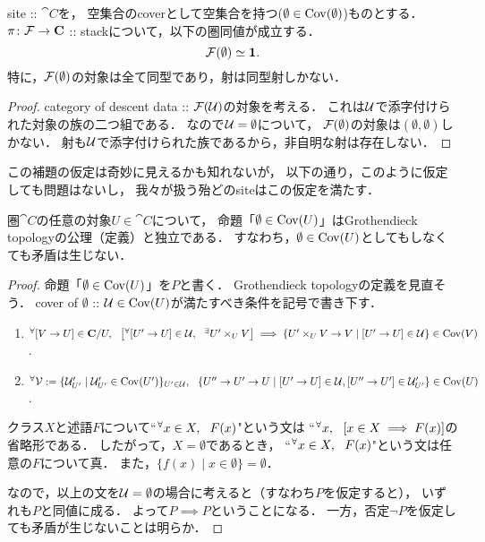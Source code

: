 \documentclass[a4paper]{jsarticle}
\begin{document}
\begin{Lemma}
    site :: $\cat{C}$を，
    空集合のcoverとして空集合を持つ($\emptyset \in \operatorname{Cov}(\emptyset)$)ものとする．
    $\pi \colon \mathcal{F} \to \mathbf{C}$ :: stackについて，以下の圏同値が成立する．
    \[ \mathcal{F}( \emptyset ) \simeq \mathbf{1}. \]
    特に，$\mathcal{F}(\emptyset)$の対象は全て同型であり，射は同型射しかない．
\end{Lemma}
\begin{proof}
    category of descent data :: $\mathcal{F}(\mathcal{U})$の対象を考える．
    これは$\mathcal{U}$で添字付けられた対象の族の二つ組である．
    なので$\mathcal{U}=\emptyset$について，
    $\mathcal{F}(\emptyset)$の対象は$(\emptyset, \emptyset)$しかない．
    射も$\mathcal{U}$で添字付けられた族であるから，非自明な射は存在しない．
\end{proof}

この補題の仮定は奇妙に見えるかも知れないが，
以下の通り，このように仮定しても問題はないし，
我々が扱う殆どのsiteはこの仮定を満たす．

\begin{Claim}
    圏$\cat{C}$の任意の対象$U \in \cat{C}$について，
    命題「$\emptyset \in \operatorname{Cov}(U)$」はGrothendieck topologyの公理（定義）と独立である．
    すなわち，$\emptyset \in \operatorname{Cov}(U)$としてもしなくても矛盾は生じない．
\end{Claim}
\begin{proof}
    命題「$\emptyset \in \operatorname{Cov}(U)$」を$P$と書く．
    Grothendieck topologyの定義を見直そう．
    cover of $\emptyset$ :: $\mathcal{U} \in \operatorname{Cov}(U)$が満たすべき条件を記号で書き下す．
    \begin{enumerate}[label=(\alph*)]
        \item
            ${}^{\forall} [V \to U] \in \mathbf{C}/U,~~
            \left[ {}^{\forall} [U' \to U] \in \mathcal{U},~~ {}^{\exists} U' \times_{U} V \right]
            \implies \{ U' \times_{U} V \to V \mid [U' \to U] \in \mathcal{U} \} \in \operatorname{Cov}(V)$.

        \item ${}^{\forall} \mathcal{V}:=\{ \mathcal{U}'_{U'} \mid \mathcal{U}'_{U'} \in \operatorname{Cov}(U')\}_{U' \in \mathcal{U}},~~
                \{ U'' \to U' \to U \mid
                    [U' \to U] \in \mathcal{U}, [U'' \to U'] \in \mathcal{U}'_{U'} \} \in \operatorname{Cov}(U)$.
    \end{enumerate}
    クラス$X$と述語$F$について``${}^{\forall} x \in X,~~ F(x)$"という文は
    ``${}^{\forall} x,~~ \left[x \in X \implies F(x)\right]$の省略形である．
    したがって，$X=\emptyset$であるとき，
    ``${}^{\forall} x \in X,~~ F(x)$"という文は任意の$F$について真．
    また，$\{ f(x) \mid x \in \emptyset \}=\emptyset$．

    なので，以上の文を$\mathcal{U}=\emptyset$の場合に考えると（すなわち$P$を仮定すると），
    いずれも$P$と同値に成る．
    よって$P \implies P$ということになる．
    一方，否定$\lnot P$を仮定しても矛盾が生じないことは明らか．
\end{proof}
\end{document}
